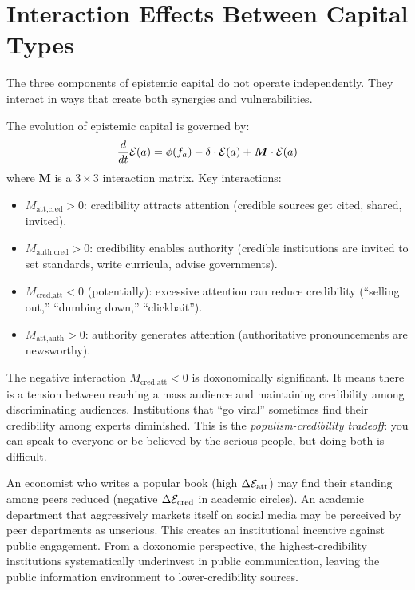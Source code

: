 \section{Interaction Effects Between Capital Types}
\label{sec:ch6-interactions}

The three components of epistemic capital do not operate independently.
They interact in ways that create both synergies and vulnerabilities.

\begin{model}
\label{mod:interaction}
The evolution of epistemic capital is governed by:
\[
  \frac{d}{dt}\mathcal{E}(a) = \phi(f_a) - \delta \cdot \mathcal{E}(a) + \bm{M} \cdot \mathcal{E}(a)
\]
where $\bm{M}$ is a $3 \times 3$ interaction matrix.
Key interactions:
\begin{itemize}[nosep]
  \item $M_{\text{att},\text{cred}} > 0$: credibility attracts attention (credible sources get cited, shared, invited).
  \item $M_{\text{auth},\text{cred}} > 0$: credibility enables authority (credible institutions are invited to set standards, write curricula, advise governments).
  \item $M_{\text{cred},\text{att}} < 0$ (potentially): excessive attention can reduce credibility (``selling out,'' ``dumbing down,'' ``clickbait'').
  \item $M_{\text{att},\text{auth}} > 0$: authority generates attention (authoritative pronouncements are newsworthy).
\end{itemize}
\end{model}

The negative interaction $M_{\text{cred},\text{att}} < 0$ is doxonomically significant.
It means there is a tension between reaching a mass audience and maintaining credibility among discriminating audiences.
Institutions that ``go viral'' sometimes find their credibility among experts diminished.
This is the \emph{populism-credibility tradeoff}: you can speak to everyone or be believed by the serious people, but doing both is difficult.

\begin{example}
\label{ex:academic-public}
An economist who writes a popular book (high $\Delta\mathcal{E}_{\text{att}}$) may find their standing among peers reduced (negative $\Delta\mathcal{E}_{\text{cred}}$ in academic circles).
An academic department that aggressively markets itself on social media may be perceived by peer departments as unserious.
This creates an institutional incentive against public engagement. From a doxonomic perspective, the highest-credibility institutions systematically underinvest in public communication, leaving the public information environment to lower-credibility sources.
\end{example}


